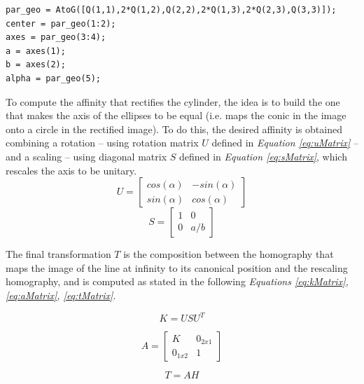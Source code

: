 \documentclass[12pt,a4paper]{article}
\begin{document}
\begin{verbatim}
par_geo = AtoG([Q(1,1),2*Q(1,2),Q(2,2),2*Q(1,3),2*Q(2,3),Q(3,3)]);
center = par_geo(1:2);
axes = par_geo(3:4);
a = axes(1);
b = axes(2);
alpha = par_geo(5);
\end{verbatim}
\bigskip

To compute the affinity that rectifies the cylinder, the idea is to build the one that makes the axis of the ellipses to be equal (i.e. maps the conic in the image onto a circle in the rectified image). To do this, the desired affinity is obtained combining a rotation -- using rotation matrix $U$ defined in \textit{Equation \ref{eq:uMatrix}} -- and a scaling -- using diagonal matrix $S$ defined in \textit{Equation \ref{eq:sMatrix}}, which rescales the axis to be unitary.\\

\begin{equation}
    U = 
    \begin{bmatrix}
    cos(\alpha) & -sin(\alpha)\\
    sin(\alpha) & cos(\alpha)
    \end{bmatrix}
    \label{eq:uMatrix}
\end{equation}
\bigskip
\begin{equation}
    S = 
    \begin{bmatrix}
    1 & 0\\
    0 & a/b
    \end{bmatrix}
    \label{eq:sMatrix}
\end{equation}
\bigskip

The final transformation $T$ is the composition between the homography that maps the image of the line at infinity to its canonical position and the rescaling homography, and is computed as stated in the following \textit{Equations \ref{eq:kMatrix}, \ref{eq:aMatrix}, \ref{eq:tMatrix}}.

\begin{equation}
    K = USU^T
    \label{eq:kMatrix}
\end{equation}

\begin{equation}
    A = 
    \begin{bmatrix}
    K & 0_{2x1}\\
    0_{1x2} & 1
    \end{bmatrix}
    \label{eq:aMatrix}
\end{equation}

\begin{equation}
    T = AH
    \label{eq:tMatrix}
\end{equation}
\bigskip
\end{document}
